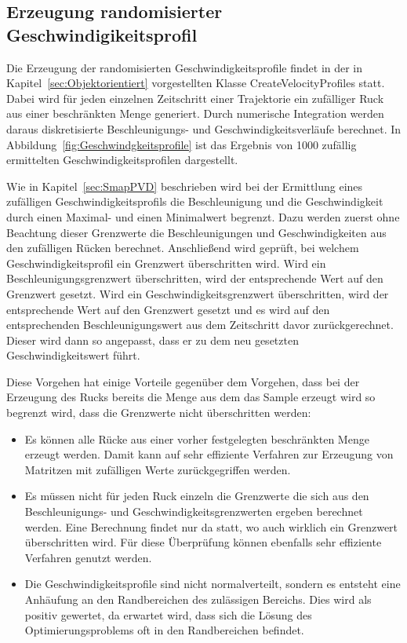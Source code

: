 \subsection{Erzeugung randomisierter Geschwindigikeitsprofil}
Die Erzeugung der randomisierten Geschwindigkeitsprofile findet in der in Kapitel~\ref{sec:Objektorientiert} vorgestellten Klasse CreateVelocityProfiles statt.
Dabei wird f\"ur jeden einzelnen Zeitschritt einer Trajektorie ein zuf\"alliger Ruck aus einer beschr\"ankten Menge generiert.
Durch numerische Integration werden daraus diskretisierte Beschleunigungs- und Geschwindigkeitsverl\"aufe berechnet.
In Abbildung~\ref{fig:Geschwindgkeitsprofile} ist das Ergebnis von 1000 zuf\"allig ermittelten Geschwindigkeitsprofilen dargestellt.

Wie in Kapitel~\ref{sec:SmapPVD} beschrieben wird bei der Ermittlung eines zuf\"alligen Geschwindigkeitsprofils die Beschleunigung und die Geschwindigkeit durch einen Maximal- und einen Minimalwert begrenzt.
Dazu werden zuerst ohne Beachtung dieser Grenzwerte die Beschleunigungen und Geschwindigkeiten aus den zuf\"alligen R\"ucken berechnet.
Anschlie{\ss}end wird gepr\"uft, bei welchem Geschwindigkeitsprofil ein Grenzwert \"uberschritten wird. 
Wird ein Beschleunigungsgrenzwert \"uberschritten, wird der entsprechende Wert auf den Grenzwert gesetzt.
Wird ein Geschwindigkeitsgrenzwert \"uberschritten, wird der entsprechende Wert auf den Grenzwert gesetzt und es wird auf den entsprechenden Beschleunigungswert aus dem Zeitschritt davor zur\"uckgerechnet.
Dieser wird dann so angepasst, dass er zu dem neu gesetzten Geschwindigkeitswert f\"uhrt.

Diese Vorgehen hat einige Vorteile gegen\"uber dem Vorgehen, dass bei der Erzeugung des Rucks bereits die Menge aus dem das Sample erzeugt wird so begrenzt wird, dass die Grenzwerte nicht \"uberschritten werden:

 \begin{itemize}
 
 \item Es k\"onnen alle R\"ucke aus einer vorher festgelegten beschr\"ankten Menge erzeugt werden.
Damit kann auf sehr effiziente Verfahren zur Erzeugung von Matritzen mit zuf\"alligen Werte zur\"uckgegriffen werden.

\item Es m\"ussen nicht f\"ur jeden Ruck einzeln die Grenzwerte die sich aus den Beschleunigungs- und Geschwindigkeitsgrenzwerten ergeben berechnet werden.
Eine Berechnung findet nur da statt, wo auch wirklich ein Grenzwert \"uberschritten wird.
F\"ur diese \"Uberpr\"ufung k\"onnen ebenfalls sehr effiziente Verfahren genutzt werden.

\item Die Geschwindigkeitsprofile sind nicht normalverteilt, sondern es entsteht eine Anh\"aufung an den Randbereichen des zul\"assigen Bereichs. 
 Dies wird als positiv gewertet, da erwartet wird, dass sich die L\"osung des Optimierungsproblems oft in den Randbereichen befindet.
 
 \end{itemize} 
 
